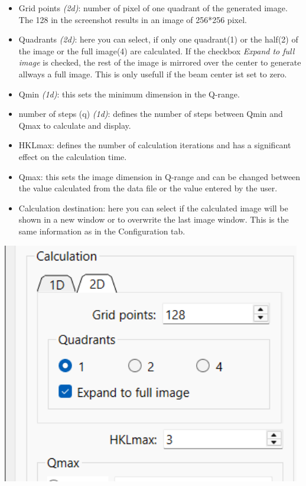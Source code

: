 \documentclass[11pt]{article} %
\begin{document}
\begin{itemize}
\begin{minipage}{0.68\textwidth}
	\begin{itemize}\itemsep0pt
	\item Grid points {\it (2d)}: number of pixel of one quadrant of the generated image. The 128 in the screenshot results in an image of 256*256 pixel.
	\item Quadrants {\it (2d)}: here you can select, if only one quadrant(1) or the half(2) of the image or the full image(4) are calculated. If the checkbox {\it Expand to full image} is checked, the rest of the image is mirrored over the center to generate allways a full image. This is only usefull if the beam center ist set to zero.
	\item Qmin {\it (1d)}: this sets the minimum dimension in the Q-range.
	\item number of steps (q) {\it (1d)}: defines the number of steps between Qmin and Qmax to calculate and display.
	\item HKLmax: defines the number of calculation iterations and has a significant effect on the calculation time.
	\item Qmax: this sets the image dimension in Q-range and can be changed between the value calculated from the data file or the value entered by the user.
	\item Calculation destination: here you can select if the calculated image will be shown in a new window or to overwrite the last image window. This is the same information as in the Configuration tab.
	\end{itemize}
\end{minipage}
\begin{minipage}{0.30\textwidth}
	\includegraphics[width=0.98\textwidth]{gui-calculations-2d.png} \\
	

\end{minipage}
\end{itemize}
\end{document}
